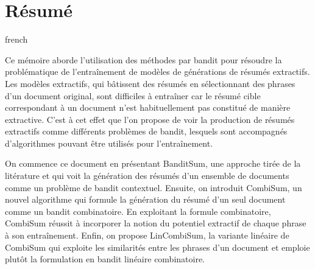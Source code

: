 \chapter*{Résumé}               %
\label{chap:resume}             %

\begin{otherlanguage*}{french}

Ce mémoire aborde l'utilisation des méthodes par bandit pour résoudre 
la problématique de l'entraînement de modèles de générations de résumés extractifs.
Les modèles extractifs, qui bâtissent des résumés en sélectionnant des phrases d'un 
document original, sont difficiles à entraîner car le résumé cible 
correspondant à un document n'est habituellement pas constitué de 
manière extractive.
C'est à cet effet que l'on propose de voir la production de résumés
extractifs comme différents problèmes de bandit, lesquels sont 
accompagnés d'algorithmes pouvant être utilisés pour l'entraînement.

On commence ce document en présentant BanditSum, une approche tirée 
de la litérature et qui voit la génération des résumés 
d'un ensemble de documents comme un problème de bandit 
contextuel.
Ensuite, on introduit CombiSum, un nouvel algorithme 
qui formule la génération du résumé d'un 
seul document comme un bandit combinatoire.
En exploitant la formule combinatoire,
CombiSum réussit à incorporer la notion du potentiel 
extractif de chaque phrase à son entraînement.
Enfin, on propose LinCombiSum, la variante linéaire de CombiSum 
qui exploite les similarités entre les phrases d'un document 
et emploie plutôt la formulation en bandit linéaire combinatoire.

\end{otherlanguage*}
